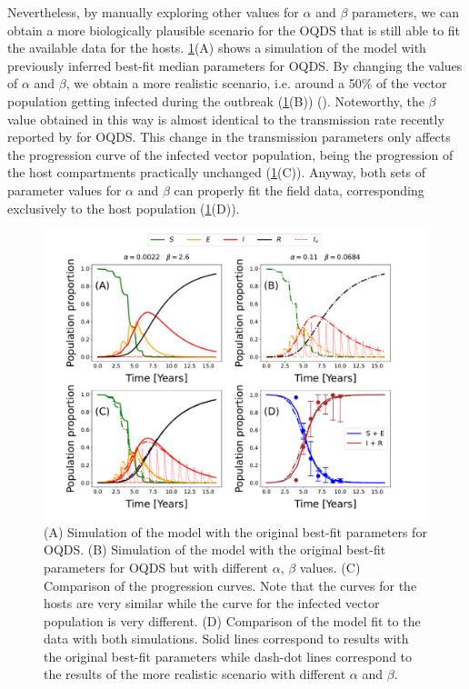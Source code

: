 Nevertheless, by manually exploring other values for $\alpha$ and $\beta$
parameters, we can obtain a more biologically plausible scenario for the OQDS
that is still able to fit the available data for the hosts.
\cref{fig:best_fit_model_OQDS}(A) shows a simulation of the model with
previously inferred best-fit median parameters for OQDS. By changing the values
of $\alpha$ and $\beta$, we obtain a more realistic scenario, i.e. around a
50\% of the vector population getting infected during the outbreak
(\cref{fig:best_fit_model_OQDS}(B)) (\cite{Cavalieri2019,
    cornara2017transmission}). Noteworthy, the $\beta$ value obtained in this
way
is almost identical to the transmission rate recently reported by
\cite{Bodino2021} for OQDS. This change in the transmission parameters only
affects the progression curve of the infected vector population, being the
progression of the host compartments practically unchanged
(\cref{fig:best_fit_model_OQDS}(C)). Anyway, both sets of parameter values for
$\alpha$ and $\beta$ can properly fit the field data, corresponding exclusively
to the	host population (\cref{fig:best_fit_model_OQDS}(D)).

\begin{figure}[H]
    \centering

    \includegraphics[width=\textwidth]{Figures/OQDS_different_vector_curves_same_host_curve.pdf}
    \caption{(A) Simulation of the model with the original best-fit
        parameters for OQDS. (B) Simulation of the model with the original
        best-fit
        parameters for OQDS but with different $\alpha$, $\beta$ values. (C)
        Comparison
        of the progression curves. Note that the curves for the hosts are very
        similar
        while the curve for the infected vector population is very different.
        (D)
        Comparison of the model fit to the data with both simulations. Solid
        lines
        correspond to results with the original best-fit parameters while
        dash-dot
        lines correspond to the results of the more realistic scenario with
        different
        $\alpha$ and $\beta$.}
    \label{fig:best_fit_model_OQDS}
\end{figure}

